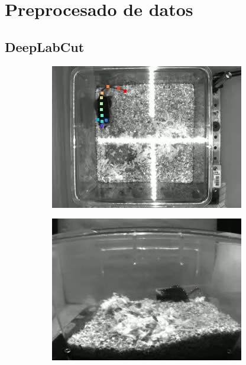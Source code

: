\section{Preprocesado de datos}

\subsection{DeepLabCut}\label{sec:DeepLabCut}

\begin{figure}[H]
  \centering
  \begin{subfigure}{0.45\textwidth}
    \centering
    \includegraphics[width=\textwidth]{figures/deeplabcut-top-example-4128-2020-12-02-1-00-37.jpg}
    \caption{}
    \label{fig:deeplabcut-top-example}
  \end{subfigure}
  \begin{subfigure}{0.45\textwidth}
    \centering
    \includegraphics[width=\textwidth]{figures/deeplabcut-lateral-example-4128-2020-12-02-1-00-37.jpg}

\end{subfigure}
\end{figure}

